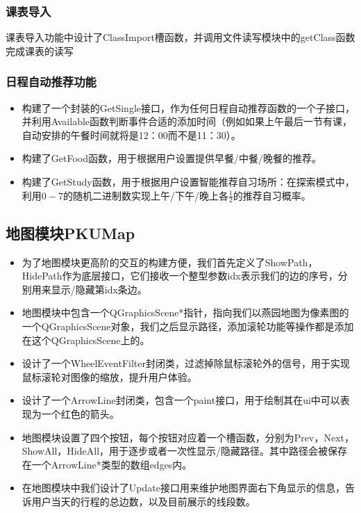 \documentclass[11pt,hyperref,a4paper,UTF8]{ctexart}
\begin{document}
\begin{CJK}{UTF8}{gkai}
\subsubsection{课表导入}
课表导入功能中设计了ClassImport槽函数，并调用文件读写模块中的getClass函数完成课表的读写

\subsubsection{日程自动推荐功能}
\begin{itemize}
    \item 构建了一个封装的GetSingle接口，作为任何日程自动推荐函数的一个子接口，并利用Available函数判断事件合适的添加时间（例如如果上午最后一节有课，自动安排的午餐时间就将是12：00而不是11：30）。
    \item 构建了GetFood函数，用于根据用户设置提供早餐/中餐/晚餐的推荐。
    \item 构建了GetStudy函数，用于根据用户设置智能推荐自习场所：在探索模式中，利用$0-7$的随机二进制数实现上午/下午/晚上各$\frac{1}{2}$的推荐自习概率。
    \label{Recom}
\end{itemize}
\subsection{地图模块PKUMap}
\begin{itemize}
    \item 为了地图模块更高阶的交互的构建方便，我们首先定义了ShowPath，HidePath作为底层接口，它们接收一个整型参数idx表示我们的边的序号，分别用来显示/隐藏第idx条边。
    \item 地图模块中包含一个QGraphicsScene*指针，指向我们以燕园地图为像素图的一个QGraphicsScene对象，我们之后显示路径，添加滚轮功能等操作都是添加在这个QGraphicsScene上的。
    \item 设计了一个WheelEventFilter封闭类，过滤掉除鼠标滚轮外的信号，用于实现鼠标滚轮对图像的缩放，提升用户体验。
    \item 设计了一个ArrowLine封闭类，包含一个paint接口，用于绘制其在ui中可以表现为一个红色的箭头。
    \item 地图模块设置了四个按钮，每个按钮对应着一个槽函数，分别为Prev，Next，ShowAll，HideAll，用于逐步或者一次性显示/隐藏路径。其中路径会被保存在一个ArrowLine*类型的数组edges内。
    \item 在地图模块中我们设计了Update接口用来维护地图界面右下角显示的信息，告诉用户当天的行程的总边数，以及目前展示的线段数。
\end{itemize}


\end{CJK}
\end{document}

